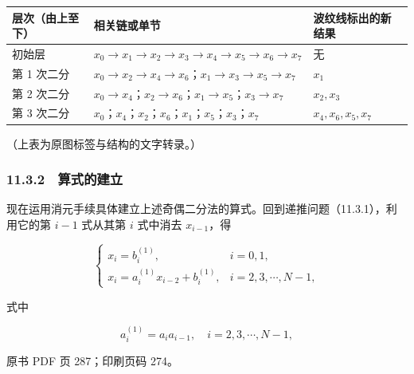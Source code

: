 {\def\LTcaptype{none} %
\begin{longtable}[]{@{}
  >{\raggedright\arraybackslash}p{}
  >{\raggedright\arraybackslash}p{}
  >{\raggedright\arraybackslash}p{}@{}}
\toprule\noalign{}
\begin{minipage}[b]{\linewidth}\raggedright
层次（由上至下）
\end{minipage} & \begin{minipage}[b]{\linewidth}\raggedright
相关链或单节
\end{minipage} & \begin{minipage}[b]{\linewidth}\raggedright
波纹线标出的新结果
\end{minipage} \\
\midrule\noalign{}
\endhead
\bottomrule\noalign{}
\endlastfoot
初始层 & \(x_0\to x_1\to x_2\to x_3\to x_4\to x_5\to x_6\to x_7\) & 无 \\
第 1 次二分 & \(x_0\to x_2\to x_4\to x_6\)；\(x_1\to x_3\to x_5\to x_7\) & \(x_1\) \\
第 2 次二分 & \(x_0\to x_4\)；\(x_2\to x_6\)；\(x_1\to x_5\)；\(x_3\to x_7\) & \(x_2,x_3\) \\
第 3 次二分 & \(x_0\)；\(x_4\)；\(x_2\)；\(x_6\)；\(x_1\)；\(x_5\)；\(x_3\)；\(x_7\) & \(x_4,x_6,x_5,x_7\) \\
\end{longtable}
}

（上表为原图标签与结构的文字转录。）

\subsubsection{11.3.2　算式的建立}\label{ch11-ux7b97ux5f0fux7684ux5efaux7acb}

现在运用消元手续具体建立上述奇偶二分法的算式。回到递推问题（11.3.1），利用它的第 \(i-1\) 式从其第 \(i\) 式中消去 \(x_{i-1}\)，得

\[
\begin{cases}
x_i=b_i^{(1)},& i=0,1,\\
x_i=a_i^{(1)}x_{i-2}+b_i^{(1)},& i=2,3,\cdots,N-1,
\end{cases}
\tag{11.3.4}
\]

式中

\[
a_i^{(1)}=a_i a_{i-1},\quad i=2,3,\cdots,N-1,
\tag{11.3.5}
\]

\clearpage

原书 PDF 页 287；印刷页码 274。


